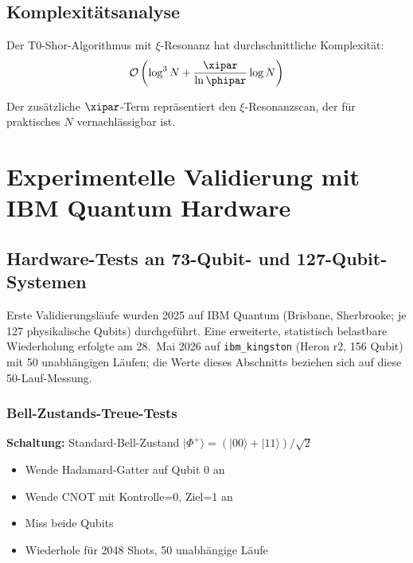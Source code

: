\subsection{Komplexitätsanalyse}

\begin{proposition}
	Der T0-Shor-Algorithmus mit $\xi$-Resonanz hat durchschnittliche Komplexität:
	\begin{equation}
		\mathcal{O}\left(\log^3 N + \frac{\xipar}{\ln \phipar} \log N\right)
	\end{equation}
\end{proposition}

Der zusätzliche $\xipar$-Term repräsentiert den $\xi$-Resonanzscan, der für praktisches $N$ vernachlässigbar ist.

\section{Experimentelle Validierung mit IBM Quantum Hardware}
\label{sec:ibm_validation}

\subsection{Hardware-Tests an 73-Qubit- und 127-Qubit-Systemen}

Erste Validierungsläufe wurden 2025 auf IBM Quantum (Brisbane, Sherbrooke; je 127 physikalische Qubits) durchgeführt. Eine erweiterte, statistisch belastbare Wiederholung erfolgte am 28.~Mai 2026 auf \texttt{ibm\_kingston} (Heron r2, 156 Qubit) mit 50 unabhängigen Läufen; die Werte dieses Abschnitts beziehen sich auf diese 50-Lauf-Messung.

\subsubsection{Bell-Zustands-Treue-Tests}

\begin{experimentbox}
	\textbf{Schaltung:} Standard-Bell-Zustand $|\Phi^+\rangle = (|00\rangle + |11\rangle)/\sqrt{2}$
	\begin{itemize}
		\item Wende Hadamard-Gatter auf Qubit 0 an
		\item Wende CNOT mit Kontrolle=0, Ziel=1 an
		\item Miss beide Qubits
		\item Wiederhole für 2048 Shots, 50 unabhängige Läufe
	\end{itemize}
\end{experimentbox}

